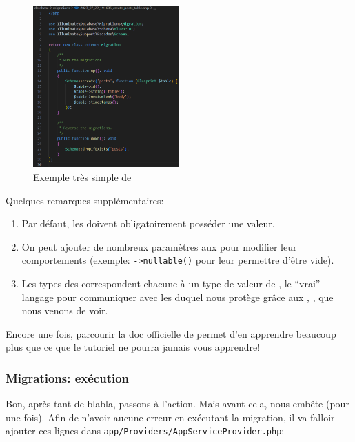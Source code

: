 \begin{figure}
    \vspace{-0.5cm}
    \includegraphics[width=0.5\textwidth]{figures-C1/post_migration.pdf}
    \caption{Exemple très simple de \migration{}\label{fig:basic_migration}}
\end{figure}
Quelques remarques supplémentaires:

\begin{enumerate}
    \item Par défaut, les \columns{} doivent obligatoirement posséder une valeur.
    \item On peut ajouter de nombreux paramètres aux \columns{} pour modifier leur comportements (exemple: \verb|->nullable()| pour leur permettre d'être vide).
    \item Les types des \column{} correspondent chacune à un type de valeur de \mysql{}, le ``vrai'' langage pour communiquer avec les \db{} duquel \laravel{} nous protège grâce aux \models{}, \migrations{}, \tables{} que nous venons de voir.
\end{enumerate}

Encore une fois, parcourir la doc officielle de \laravel{} permet d'en apprendre beaucoup plus que ce que le tutoriel ne pourra jamais vous apprendre!

\subsubsection[Migrations: exécution]{Migrations: exécution}

Bon, après tant de blabla, passons à l'action. Mais avant cela, \laravel{} nous embête (pour une fois). Afin de n'avoir aucune erreur en exécutant la migration, il va falloir ajouter ces lignes dans \verb|app/Providers/AppServiceProvider.php|:

